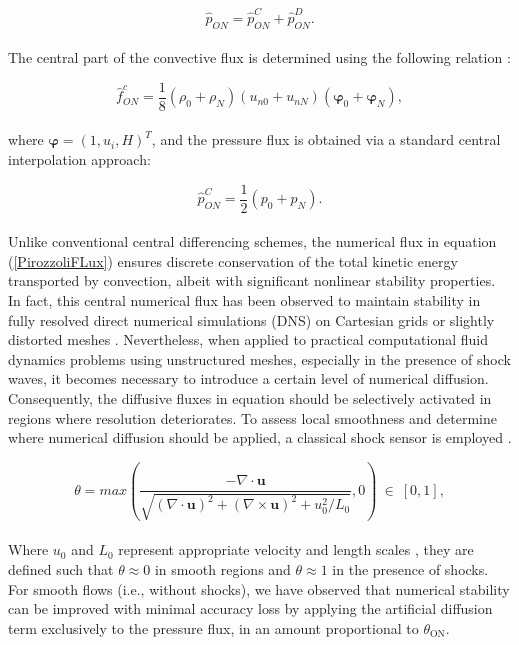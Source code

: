 \documentclass[a5paper]{sapthesis}
\begin{document}
	\begin{equation}
		\hat{p}_{ON} = \hat{p}^{C}_{ON} + \hat{p}^{D}_{ON}.
		\label{diffusive_central_diffusive_fluxes}
	\end{equation}
	\\
	The central part of the convective flux is determined using the following relation \cite{PIROZZOLI20107180}:
	
	\begin{equation}
		\hat{f}^{c}_{ON} = \frac{1}{8} (\rho_0 + \rho_N) (u_{n0} + u_{nN}) (\boldsymbol{\varphi}_0 + \boldsymbol{\varphi}_N),
		\label{PirozzoliFLux}
	\end{equation}
	\\
	where $\boldsymbol{\varphi} = (1, u_i, H)^T$, and the pressure flux is obtained via a standard central interpolation approach:
	
	\begin{equation}
		\hat{p}^{C}_{ON} = \frac{1}{2} (p_0 + p_N).
	\end{equation}
	\\
	Unlike conventional central differencing schemes, the numerical flux in equation (\ref{PirozzoliFLux}) ensures discrete conservation of the total kinetic energy transported by convection, albeit with significant nonlinear stability properties. In fact, this central numerical flux has been observed to maintain stability in fully resolved direct numerical simulations (DNS) on Cartesian grids or slightly distorted meshes \cite{PIROZZOLI20107180,PIROZZOLI20112997}. Nevertheless, when applied to practical computational fluid dynamics problems using unstructured meshes, especially in the presence of shock waves, it becomes necessary to introduce a certain level of numerical diffusion. Consequently, the diffusive fluxes in equation should be selectively activated in regions where resolution deteriorates. To assess local smoothness and determine where numerical diffusion should be applied, a classical shock sensor is employed \cite{DUCROS1999}.
	
	\begin{equation}
		\theta = max\left (\dfrac{-\nabla \cdot \mathbf{u}}{\sqrt{(\nabla \cdot \mathbf{u})^2 + (\nabla \times \mathbf{u})^2 + u_0^2/L_0}}, 0 \right ) \ \in \ [0,1],
	\end{equation}
	\\
	Where $u_0$ and $L_0$ represent appropriate velocity and length scales \cite{Pirozzoli2011}, they are defined such that $ \theta \approx 0 $ in smooth regions and $ \theta \approx 1 $ in the presence of shocks.  
	\\
	For smooth flows (i.e., without shocks), we have observed that numerical stability can be improved with minimal accuracy loss by applying the artificial diffusion term exclusively to the pressure flux, in an amount proportional to $ \theta_{\text{ON}} $. 
	
\end{document}
